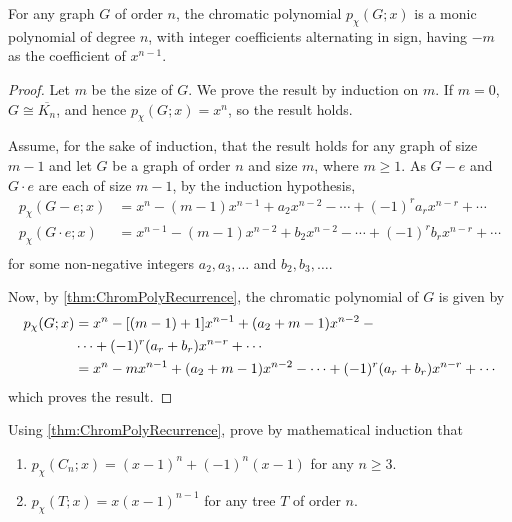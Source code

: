 \begin{Theorem}[Whitney]
For any graph $G$ of order $n$, the chromatic polynomial $p_\chi(G; x)$ is a monic polynomial of degree $n$, with integer coefficients alternating in sign, having $-m$ as the coefficient of $x^{n - 1}$.
\end{Theorem}

\begin{proof}
Let $m$ be the size of $G$. We prove the result by induction on $m$. If $m = 0$, $G \cong \overline{K_n}$, and hence $p_\chi(G; x) = x^n$, so the result holds.

Assume, for the sake of induction, that the result holds for any graph of size $m - 1$ and let $G$ be a graph of order $n$ and size $m$, where $m \ge 1$. As $G - e$ and $G \cdot e$ are each of size $m - 1$, by the induction hypothesis,
\begin{align*}
p_\chi(G - e; x) 		& = x^n - (m - 1) x^{n - 1} + a_2 x^{n - 2} - \cdots + (-1)^r a_r x^{n - r} + \cdots \\
p_\chi(G \cdot e; x)	& = x^{n - 1} - (m - 1) x^{n - 2} + b_2 x^{n - 2} - \cdots + (-1)^r b_r x^{n - r} + \cdots \\
\end{align*}
for some non-negative integers $a_2, a_3, \ldots$ and $b_2, b_3, \ldots$.

Now, by \cref{thm:ChromPolyRecurrence}, the chromatic polynomial of $G$ is given by
\begin{align*}
p_\chi(G; x) & = x^n - [(m - 1) + 1] x^{n - 1} + (a_2 + m - 1) x^{n - 2} - {} \\ & \cdots + (-1)^r(a_r + b_r) x^{n - r} + \cdots \\
	& = x^n - m x^{n - 1} + (a_2 + m - 1) x^{n - 2} - \cdots + (-1)^r(a_r + b_r) x^{n - r} + \cdots
\end{align*}
which proves the result.
\end{proof}

\begin{Exercise}
Using \cref{thm:ChromPolyRecurrence}, prove by mathematical induction that
\begin{enumerate}
\item $p_\chi(C_n; x) = (x - 1)^n + (-1)^n (x - 1)$ for any $n \ge 3$.
\item $p_\chi(T; x) = x(x - 1)^{n - 1}$ for any tree $T$ of order $n$.
\end{enumerate}
\end{Exercise}
